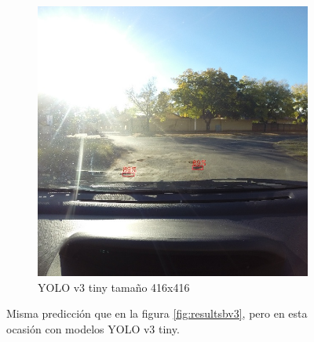\begin{figure}[H]
\begin{subfigure}[h]{0.45\linewidth}
		\includegraphics[width=\linewidth]{images/results_b_yolo_v3_tiny_416.jpg}
		\caption{YOLO v3 tiny tamaño 416x416}
	\end{subfigure}
	\caption{Misma predicción que en la figura \ref{fig:resultsbv3}, pero en esta ocasión con modelos YOLO v3 tiny.}
	\label{fig:resultsbv3tiny}
\end{figure}